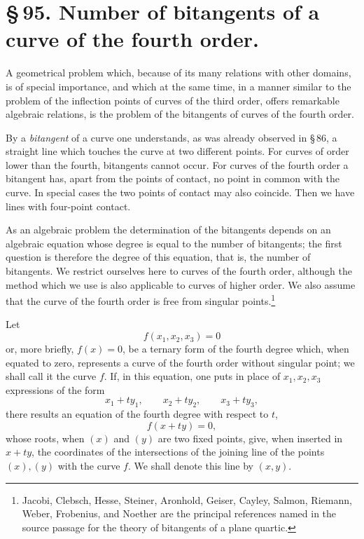 \documentclass[11pt]{article}
\begin{document}
\section*{\S\,95. Number of bitangents of a curve of the fourth order.}

A geometrical problem which, because of its many relations with other domains, is of special importance, and which at the same time, in a manner similar to the problem of the inflection points of curves of the third order, offers remarkable algebraic relations, is the problem of the bitangents of curves of the fourth order.

By a \emph{bitangent} of a curve one understands, as was already observed in \S\,86, a straight line which touches the curve at two different points. For curves of order lower than the fourth, bitangents cannot occur. For curves of the fourth order a bitangent has, apart from the points of contact, no point in common with the curve. In special cases the two points of contact may also coincide. Then we have lines with four-point contact.

As an algebraic problem the determination of the bitangents depends on an algebraic equation whose degree is equal to the number of bitangents; the first question is therefore the degree of this equation, that is, the number of bitangents. We restrict ourselves here to curves of the fourth order, although the method which we use is also applicable to curves of higher order. We also assume that the curve of the fourth order is free from singular points.\footnote{Jacobi, Clebsch, Hesse, Steiner, Aronhold, Geiser, Cayley, Salmon, Riemann, Weber, Frobenius, and Noether are the principal references named in the source passage for the theory of bitangents of a plane quartic.}

Let
\begin{equation}
 f(x_1,x_2,x_3)=0
 \tag{1}
\end{equation}
or, more briefly, \(f(x)=0\), be a ternary form of the fourth degree which, when equated to zero, represents a curve of the fourth order without singular point; we shall call it the curve \(f\). If, in this equation, one puts in place of \(x_1,x_2,x_3\) expressions of the form
\[
 x_1+t y_1,\qquad x_2+t y_2,\qquad x_3+t y_3,
\]
there results an equation of the fourth degree with respect to \(t\),
\begin{equation}
 f(x+t y)=0,
 \tag{2}
\end{equation}
whose roots, when \((x)\) and \((y)\) are two fixed points, give, when inserted in \(x+t y\), the coordinates of the intersections of the joining line of the points \((x),(y)\) with the curve \(f\). We shall denote this line by \((x,y)\).
\end{document}
